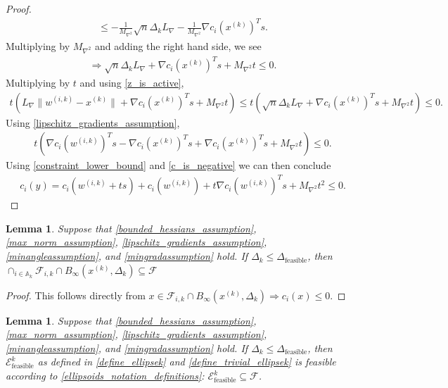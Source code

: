 \documentclass{article}
\newtheorem{lemma}[theorem]{Lemma}
\theoremstyle{case}
\numberwithin{theorem}{subsection}
\newcommand{\activeconstraintsk}{{\mathbb A_{k}}}
\newcommand{\dfeas}{{\Delta_{\textrm{feasible}}}}
\newcommand{\dk}{\Delta_k}
\newcommand{\feasible}{{\mathcal F}}
\newcommand{\fik}{{\mathcal F_{i, k}}}
\newcommand{\lipgrad}{{L_{\nabla}}}
\newcommand{\maxhessian}{{M_{\nabla^2}}}
\newcommand{\tr}{{ B_{\infty}\left(\xk, \dk\right) }}
\newcommand{\unshiftedellipsoid}{{\mathcal E^k_{\textrm{feasible}}}}
\newcommand{\wik}{{w^{(i, k)}}}
\newcommand{\xk}{{x^{(k)}}}
\begin{document}
\begin{proof}
\begin{align*}
\le -\frac 1 \maxhessian \sqrt{n}\dk \lipgrad -\frac 1 \maxhessian \nabla c_i(\xk)^Ts.
\end{align*}
Multiplying by $\maxhessian$ and adding the right hand side, we see
\begin{align*}
\Longrightarrow \sqrt{n}\dk \lipgrad + \nabla c_i(\xk)^Ts + \maxhessian t \le 0.
\end{align*}
Multiplying by $t$ and using \cref{z_is_active},
\begin{align*}
 t \left(\lipgrad\|\wik - \xk\| + \nabla c_i(\xk)^Ts + \maxhessian t\right) \le t \left(\sqrt{n}\dk \lipgrad + \nabla c_i(\xk)^Ts + \maxhessian t\right) \le 0.
\end{align*}
Using \cref{lipschitz_gradients_assumption},
\begin{align*}
t \left(\nabla c_i(\wik)^Ts - \nabla c_i(\xk)^Ts + \nabla c_i(\xk)^Ts + \maxhessian t\right) \le 0.
\end{align*}
Using \cref{constraint_lower_bound} and \cref{c_is_negative} we can then conclude
\begin{align*}
c_i(y) = c_i(\wik + ts) + c_i(\wik) + t\nabla c_i(\wik)^Ts + \maxhessian t^2 \le 0.
\end{align*}

\end{proof}




\begin{lemma}
\label{cone_and_tr_are_feasible}
Suppose that 
\cref{bounded_hessians_assumption},
\cref{max_norm_assumption},
\cref{lipschitz_gradients_assumption},
\cref{minangleassumption},
and \cref{mingradassumption} hold.
If $\dk \le \dfeas$, then $\cap_{i \in \activeconstraintsk} \fik \cap \tr \subseteq \feasible$ 
\end{lemma}


\begin{proof}
This follows directly from $x \in \fik \cap \tr \Longrightarrow c_i(x) \le 0$.
\end{proof}


\begin{lemma}
\label{ellipsoid_is_feaisble}
Suppose that 
\cref{bounded_hessians_assumption},
\cref{max_norm_assumption},
\cref{lipschitz_gradients_assumption},
\cref{minangleassumption},
and \cref{mingradassumption} hold.
If $\dk \le \dfeas$, then $\unshiftedellipsoid$ as defined in \cref{define_ellipsek} and \cref{define_trivial_ellipsek} is feasible according to 
\cref{ellipsoids_notation_definitions}:
$\unshiftedellipsoid \subseteq \feasible$.
\end{lemma}
\end{document}
